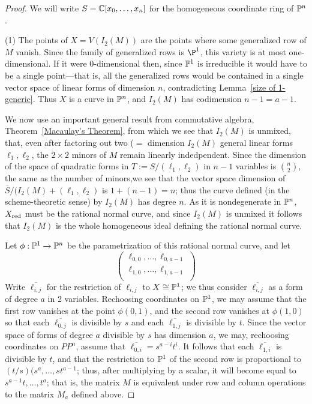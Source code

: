 \begin{proof} 
We will write $S = \CC[x_{0},\dots,x_{n}]$ for the homogeneous coordinate ring of
$\PP^{n}$.

(1) The points of  $X = V(I_{2}(M))$ are the points where some generalized
row of $M$ vanish. Since the family of generalized rows is $\P^{1}$, this variety is
at most one-dimensional. If it were 0-dimensional then, since $\PP^{1}$ is irreducible
it would have to be a single point---that is, all the generalized rows would be contained
in a single vector space of linear forms of dimension $n$, contradicting Lemma~\ref{size of 1-generic}.
Thus $X$ is a curve in $\PP^{n}$, and $I_{2}(M)$ has codimension $n-1 = a-1$.

We now use an important general result from commutative algebra, Theorem~\ref{Macaulay's Theorem}, from which we see that $I_{2}(M)$ is unmixed, that, even after factoring out two ($=$ dimension $I_{2}(M)$ general linear forms $\ell_{1}, \ell_{2}$, the $2\times 2$ minors of $M$ remain linearly indedpendent.   Since the dimension of the space of quadratic forms in 
$T := S/(\ell_{1}, \ell_{2})$ in $n-1$ variables is ${n\choose 2}$,  the same as the number of minors,we see that the vector space dimension of $\overline S/(I_{2}(M)+(\ell_{1}, \ell_{2})$
is $1+(n-1) = n$; thus the curve defined (in the scheme-theoretic sense) by $I_{2}(M)$ 
has degree $n$. As it is nondegenerate in $\PP^{n}$, $X_{\rm red}$ must be the rational normal curve, and since $I_{2}(M)$ is unmixed it follows that $I_{2}(M)$ is the whole homogeneous ideal
defining the rational normal curve.

Let $\phi: \PP^{1}\to \PP^{n}$ be the parametrization of this rational normal curve, and let
$$
\begin{pmatrix}
 \ell_{0,0},\dots, \ell_{0,a-1}\\
  \ell_{1,0},\dots, \ell_{1,a-1}\\
\end{pmatrix}
$$
 Write $\overline{\ell_{i,j}}$ for the restriction of $\ell_{i,j}$ to $X \cong \PP^{1}$; we thus consider
  $\overline{\ell_{i,j}}$ as a form of degree $a$ in 2 variables. 
 Rechoosing coordinates on $\PP^{1}$, we may assume that the first row vanishes at the point $\phi(0,1)$, and the second row vanishes at $\phi(1,0)$ so that each $\overline{\ell_{0,j}}$ is divisible by $s$ and each $\overline{\ell_{1,j}}$ is divisible by $t$. Since the vector space of forms of degree $a$ divisible by $s$ has dimension $a$, we may, rechoosing coordinates on $PP^{n}$, assume that $\overline{\ell_{0,i}} = s^{a-i}t^{i}$. It follows that
each $\overline{\ell_{1,i}}$ is divisible by $t$, and that the restriction to $\PP^{1}$ of the second
row is proportional to $(t/s)(s^{a},\dots,st^{a-1}$; thus, after multiplying by a scalar, it will become
equal to $s^{a-1}t,\dots,t^{a}$; that is, the matrix $M$ is equivalent under row and column operations to the matrix $M_{a}$ defined above.


\end{proof}
